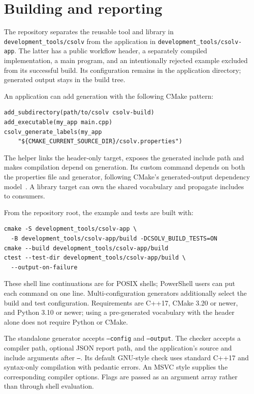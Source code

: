 \documentclass[11pt]{article}
\begin{document}
\section{Building and reporting}
The repository separates the reusable tool and library in
\texttt{development\_tools/csolv} from the application in
\texttt{development\_tools/csolv-app}. The latter has a public workflow header,
a separately compiled implementation, a main program, and an intentionally
rejected example excluded from its successful build. Its configuration remains
in the application directory; generated output stays in the build tree.

An application can add generation with the following CMake pattern:
\begin{lstlisting}[language={}]
add_subdirectory(path/to/csolv csolv-build)
add_executable(my_app main.cpp)
csolv_generate_labels(my_app
    "${CMAKE_CURRENT_SOURCE_DIR}/csolv.properties")
\end{lstlisting}
The helper links the header-only target, exposes the generated include path
and makes compilation depend on generation. Its custom command depends on
both the properties file and generator, following CMake's generated-output
dependency model~\cite{cmake}. A library target can own the shared vocabulary
and propagate includes to consumers.

From the repository root, the example and tests are built with:
\begin{lstlisting}[language={}]
cmake -S development_tools/csolv-app \
  -B development_tools/csolv-app/build -DCSOLV_BUILD_TESTS=ON
cmake --build development_tools/csolv-app/build
ctest --test-dir development_tools/csolv-app/build \
  --output-on-failure
\end{lstlisting}
These shell line continuations are for POSIX shells; PowerShell users can put
each command on one line. Multi-configuration generators additionally select
the build and test configuration. Requirements are C++17, CMake 3.20 or newer,
and Python 3.10 or newer; using a pre-generated vocabulary with the header alone
does not require Python or CMake.

The standalone generator accepts \texttt{--config} and \texttt{--output}. The
checker accepts a compiler path, optional JSON report path, and the application's
source and include arguments after \texttt{--}. Its default GNU-style check
uses standard C++17 and syntax-only compilation with pedantic errors. An MSVC
style supplies the corresponding compiler options. Flags are passed as an
argument array rather than through shell evaluation.
\end{document}

